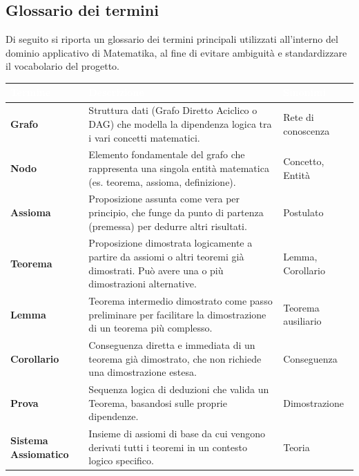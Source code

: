 \documentclass[12pt,a4paper]{article}
\begin{document}
\subsection{Glossario dei termini}
Di seguito si riporta un glossario dei termini principali utilizzati all'interno del dominio applicativo di Matematika, al fine di evitare ambiguità e standardizzare il vocabolario del progetto.

\begin{table}[H]
    \centering
    \small
    \begin{tabularx}{\textwidth}{|l|X|p{3cm}|}
        \hline
        \rowcolor{PrimaryBlue} \textcolor{white}{\textbf{Termine}} & \textcolor{white}{\textbf{Descrizione}} & \textcolor{white}{\textbf{Sinonimi}} \\
        \hline
        \textbf{Grafo} & Struttura dati (Grafo Diretto Aciclico o DAG) che modella la dipendenza logica tra i vari concetti matematici. & Rete di conoscenza \\
        \hline
        \rowcolor{CodeBg} \textbf{Nodo} & Elemento fondamentale del grafo che rappresenta una singola entità matematica (es. teorema, assioma, definizione). & Concetto, Entità \\
        \hline
        \textbf{Assioma} & Proposizione assunta come vera per principio, che funge da punto di partenza (premessa) per dedurre altri risultati. & Postulato \\
        \hline
        \rowcolor{CodeBg} \textbf{Teorema} & Proposizione dimostrata logicamente a partire da assiomi o altri teoremi già dimostrati. Può avere una o più dimostrazioni alternative. & Lemma, Corollario \\
        \hline
        \textbf{Lemma} & Teorema intermedio dimostrato come passo preliminare per facilitare la dimostrazione di un teorema più complesso. & Teorema ausiliario \\
        \hline
        \rowcolor{CodeBg} \textbf{Corollario} & Conseguenza diretta e immediata di un teorema già dimostrato, che non richiede una dimostrazione estesa. & Conseguenza \\
        \hline
        \textbf{Prova} & Sequenza logica di deduzioni che valida un Teorema, basandosi sulle proprie dipendenze. & Dimostrazione \\
        \hline
        \rowcolor{CodeBg}         \textbf{Sistema Assiomatico} & Insieme di assiomi di base da cui vengono derivati tutti i teoremi in un contesto logico specifico. & Teoria \\
        \hline

\end{tabularx}
\end{table}
\end{document}
